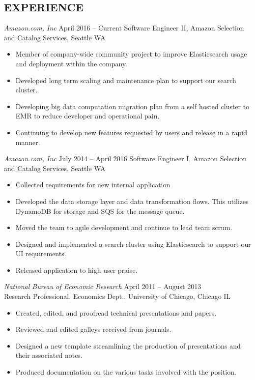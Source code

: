 \documentclass[line,margin]{res}
\begin{document}
\address{3040 17th Ave W, Unit 508, Seattle, WA 98119}
\address{(770) 833-3134\\ jake.whitaker@gmail.com}

\begin{resume}
  
  \section{EXPERIENCE}

  {\sl Amazon.com, Inc}
  \hfill April 2016 -- Current
  Software Engineer II, Amazon Selection and Catalog Services, Seattle WA
  \begin{itemize}  \itemsep-2pt
  \item Member of company-wide community project to improve Elasticsearch usage and deployment within the company.
  \item Developed long term scaling and maintenance plan to support our search cluster.
  \item Developing big data computation migration plan from a self hosted cluster to EMR to reduce developer and operational pain.
  \item Continuing to develop new features requested by users and release in a rapid manner.
  \end{itemize}
  
  {\sl Amazon.com, Inc}
  \hfill July 2014 -- April 2016
  Software Engineer I, Amazon Selection and Catalog Services, Seattle WA
  \begin{itemize}  \itemsep-2pt
  \item Collected requirements for new internal application
  \item Developed the data storage layer and data transformation flows.  This utilizes DynamoDB for storage and SQS for the message queue.
  \item Moved the team to agile development and continue to lead team scrum.
  \item Designed and implemented a search cluster using Elasticsearch to support our UI requirements. 
  \item Released application to high user praise.
  \end{itemize}
  
  {\sl National Bureau of Economic Research}
  \hfill April 2011 -- August 2013 \\
  Research Professional, Economics Dept., University of Chicago, Chicago IL
  \begin{itemize}  \itemsep-2pt
  \item Created, edited, and proofread technical presentations and papers.
  \item Reviewed and edited galleys received from journals.
  \item Designed a new template streamlining the production of presentations and their associated notes.
  \item Produced documentation on the various tasks involved with the position.
  \end{itemize}
  

\end{resume}
\end{document}

